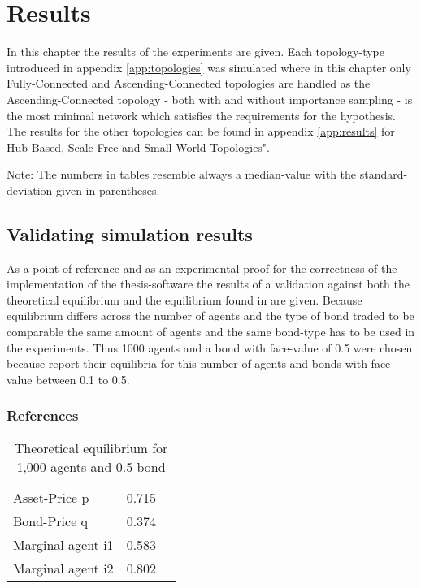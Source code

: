 \documentclass[Bachelorarbeit.tex]{subfiles}
\begin{document}
\graphicspath{{./figures/results/}}	%

\chapter{Results}
\label{ch:results}

In this chapter the results of the experiments are given. Each topology-type introduced in appendix \ref{app:topologies} was simulated where in this chapter only Fully-Connected and Ascending-Connected topologies are handled as the Ascending-Connected topology - both with and without importance sampling - is the most minimal network which satisfies the requirements for the hypothesis. The results for the other topologies can be found in appendix \ref{app:results} for Hub-Based, Scale-Free and Small-World Topologies".

Note: The numbers in tables resemble always a median-value with the standard-deviation given in parentheses.

\section{Validating simulation results}
As  a point-of-reference and as an experimental proof for the correctness of the implementation of the thesis-software the results of a validation against both the theoretical equilibrium and the equilibrium found in \cite{Breuer2015} are given. Because equilibrium differs across the number of agents and the type of bond traded to be comparable the same amount of agents and the same bond-type has to be used in the experiments. Thus 1000 agents and a bond with face-value of 0.5 were chosen because \cite{Breuer2015} report their equilibria for this number of agents and bonds with face-value between 0.1 to 0.5.

\subsection{References}

\begin{table}[H]
	\centering
	\caption{Theoretical equilibrium for 1,000 agents and 0.5 bond}
	\begin{tabular} { l c r }
		\hline
		Asset-Price p & 0.715 \\
		Bond-Price q & 0.374 \\
		Marginal agent i1 & 0.583 \\
		Marginal agent i2 & 0.802 \\
		\hline
	\end{tabular}
	\label{tab:equilibrium_THEORY_1000}
\end{table}
\end{document}
